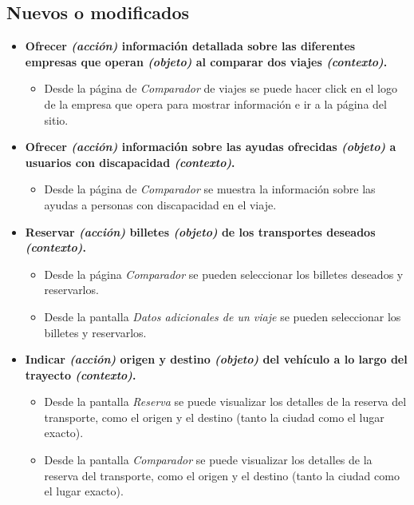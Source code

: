 \subsection*{Nuevos o modificados}

\begin{itemize}
    \item \textbf{Ofrecer \textit{(acción)} información detallada sobre las diferentes empresas que operan
        \textit{(objeto)} al comparar dos viajes \textit{(contexto)}.}
        \begin{itemize}
            \item Desde la página de \textit{Comparador} de viajes se puede hacer click en el logo de la empresa que
                opera para mostrar información e ir a la página del sitio.
        \end{itemize}
    
    \item \textbf{Ofrecer \textit{(acción)} información sobre las ayudas ofrecidas \textit{(objeto)} a usuarios 
        con discapacidad \textit{(contexto)}.}
        \begin{itemize}
            \item Desde la página de \textit{Comparador} se muestra la información sobre las ayudas a personas
                con discapacidad en el viaje.
        \end{itemize}
    
    \item \textbf{Reservar \textit{(acción)} billetes \textit{(objeto)} de los transportes deseados \textit{(contexto)}.} 
        \begin{itemize}
            \item Desde la página \textit{Comparador} se pueden seleccionar los billetes deseados y reservarlos.
            \item Desde la pantalla \textit{Datos adicionales de un viaje} se pueden seleccionar los billetes y reservarlos.
        \end{itemize}

    \item \textbf{Indicar \textit{(acción)} origen y destino \textit{(objeto)} del vehículo a lo largo del trayecto
        \textit{(contexto)}.}
        \begin{itemize}
            \item Desde la pantalla \textit{Reserva} se puede visualizar los detalles de la reserva del transporte, como el origen y el destino (tanto
                la ciudad como el lugar exacto).
            \item Desde la pantalla \textit{Comparador} se puede visualizar los detalles de la reserva del transporte, como el origen y el destino (tanto
            la ciudad como el lugar exacto).
        \end{itemize}


\end{itemize}

